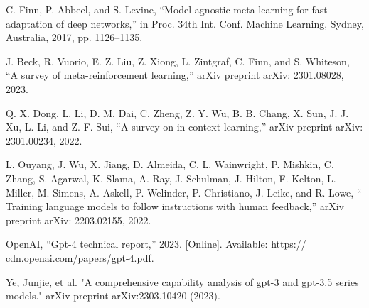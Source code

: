 \documentclass[conference]{IEEEtran}
\begin{document}
\begin{thebibliography}{00}
 C. Finn, P. Abbeel, and S. Levine, “Model-agnostic meta-learning for fast adaptation of deep networks,” in Proc. 34th Int. Conf. Machine Learning, Sydney, Australia, 2017, pp. 1126–1135.

 J. Beck, R. Vuorio, E. Z. Liu, Z. Xiong, L. Zintgraf, C. Finn, and S. Whiteson, “A survey of meta-reinforcement learning,” arXiv preprint arXiv: 2301.08028, 2023.


 Q. X. Dong, L. Li, D. M. Dai, C. Zheng, Z. Y. Wu, B. B. Chang, X. Sun, J. J. Xu, L. Li, and Z. F. Sui, “A survey on in-context learning,” arXiv preprint arXiv: 2301.00234, 2022.

 L. Ouyang, J. Wu, X. Jiang, D. Almeida, C. L. Wainwright, P. Mishkin, C. Zhang, S. Agarwal, K. Slama, A. Ray, J. Schulman, J. Hilton, F. Kelton, L. Miller, M. Simens, A. Askell, P. Welinder, P. Christiano, J. Leike, and R. Lowe, “ Training language models to follow instructions with human feedback,” arXiv preprint arXiv: 2203.02155, 2022.


 OpenAI, “Gpt-4 technical report,” 2023. [Online]. Available: https:// cdn.openai.com/papers/gpt-4.pdf.


 Ye, Junjie, et al. "A comprehensive capability analysis of gpt-3 and gpt-3.5 series models." arXiv preprint arXiv:2303.10420 (2023).








\end{thebibliography}
\end{document}
